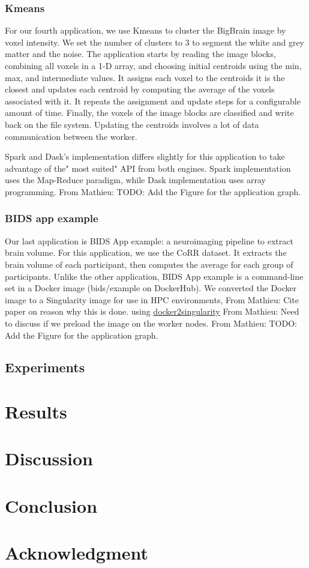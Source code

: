 \documentclass[conference]{IEEEtran}
\newcommand{\MD}[1]{\color{magenta}From Mathieu: #1 \color{black}}
\begin{document}
\subsubsection{Kmeans} %
For our fourth application, we use Kmeans to cluster the BigBrain image by voxel intensity.
We set the number of clusters to 3 to segment the white and grey matter and the noise.
The application starts by reading the image blocks, combining all voxels in a 1-D array, and choosing initial centroids using the min, max, and intermediate values.
It assigns each voxel to the centroids it is the closest and updates each centroid by computing the average of the voxels associated with it. 
It repeats the assignment and update steps for a configurable amount of time. 
Finally, the voxels of the image blocks are classified and write back on the file system.
Updating the centroids involves a lot of data communication between the worker.
	
Spark and Dask's implementation differs slightly for this application to take advantage of the" most suited" API from both engines.
Spark implementation uses the Map-Reduce paradigm, while Dask implementation uses array programming.
\MD{TODO: Add the Figure for the application graph.}
	
	
\subsubsection{BIDS app example}
Our last application is BIDS App example: a neuroimaging pipeline to extract brain volume.
For this application, we use the CoRR dataset.
It extracts the brain volume of each participant, then computes the average for each group of participants.
Unlike the other application, BIDS App example is a command-line set in a Docker image (bids/example on DockerHub).
We converted the Docker image to a Singularity image for use in HPC environments, \MD{Cite paper on reason why this is done.}
using \href{https://hub.docker.com/r/singularityware/docker2singularity/tags/}{docker2singularity}
\MD{Need to discuss if we preload the image on the worker nodes.}
\MD{TODO: Add the Figure for the application graph.}
	
\subsection{Experiments} %
	
\section{Results} %
	
\section{Discussion} %
	
\section{Conclusion} %
	
\section*{Acknowledgment} %
	
	


	
\end{document}
